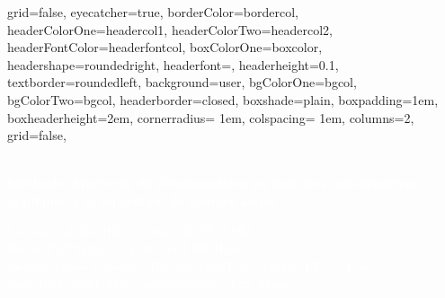 \documentclass[a0paper,portrait]{baposter}
\begin{document}
\begin{poster}{
	grid=false,
	eyecatcher=true, 
	borderColor=bordercol,
	headerColorOne=headercol1,
	headerColorTwo=headercol2,
	headerFontColor=headerfontcol,
	boxColorOne=boxcolor,
	headershape=roundedright,
	headerfont=\Large\textsf,
	headerheight=0.1\textheight,
	textborder=roundedleft,
	background=user,
	bgColorOne=bgcol,
	bgColorTwo=bgcol,
	headerborder=closed,
  boxshade=plain,
  boxpadding=1em,
  boxheaderheight=2em,
  cornerradius= 1em,
  colspacing= 1em,
  columns=2,
  grid=false,
}
{
	\setlength\fboxsep{0pt}
	\setlength\fboxrule{0.5pt}
		
}	
{ \bf \\ 
	\huge \textcolor{white}{Méthode structurée de décomposition en matrices non-négatives appliquée à la séparation de sources audio}
}
{ \sf \large
	\vspace{0em} \textcolor{white}{Cl\'{e}ment LAROCHE, Matthieu KOWALSKI,\\ H\'{e}l\`{e}ne PAPADOPOULOS, Ga\"{e}l RICHARD}\\
	{\sf \normalsize \textcolor{white}{Institut Mines-T\'el\'ecom - T\'el\'ecom ParisTech - CNRS/LTCI , France}}\\
    {\sf \normalsize \textcolor{white}{Univ Paris-Sud-CNRS-CentraleSupelec, L2S, France}}\\
\vspace{0em}

}
\end{poster}
\end{document}
